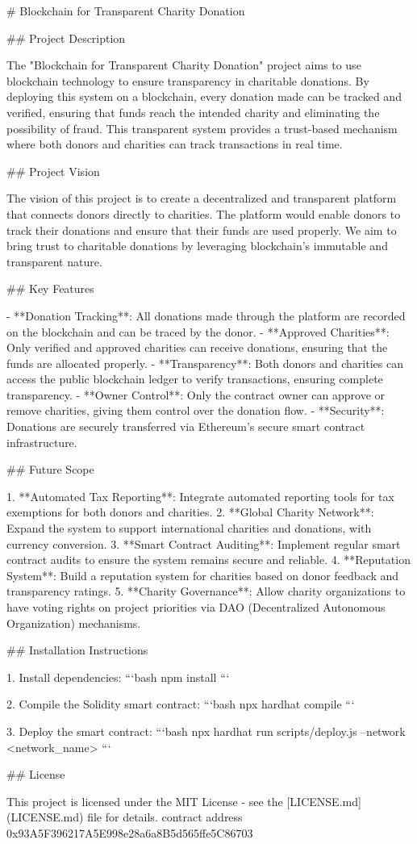 # Blockchain for Transparent Charity Donation

## Project Description

The "Blockchain for Transparent Charity Donation" project aims to use blockchain technology to ensure transparency in charitable donations. By deploying this system on a blockchain, every donation made can be tracked and verified, ensuring that funds reach the intended charity and eliminating the possibility of fraud. This transparent system provides a trust-based mechanism where both donors and charities can track transactions in real time.

## Project Vision

The vision of this project is to create a decentralized and transparent platform that connects donors directly to charities. The platform would enable donors to track their donations and ensure that their funds are used properly. We aim to bring trust to charitable donations by leveraging blockchain's immutable and transparent nature.

## Key Features

- **Donation Tracking**: All donations made through the platform are recorded on the blockchain and can be traced by the donor.
- **Approved Charities**: Only verified and approved charities can receive donations, ensuring that the funds are allocated properly.
- **Transparency**: Both donors and charities can access the public blockchain ledger to verify transactions, ensuring complete transparency.
- **Owner Control**: Only the contract owner can approve or remove charities, giving them control over the donation flow.
- **Security**: Donations are securely transferred via Ethereum’s secure smart contract infrastructure.

## Future Scope

1. **Automated Tax Reporting**: Integrate automated reporting tools for tax exemptions for both donors and charities.
2. **Global Charity Network**: Expand the system to support international charities and donations, with currency conversion.
3. **Smart Contract Auditing**: Implement regular smart contract audits to ensure the system remains secure and reliable.
4. **Reputation System**: Build a reputation system for charities based on donor feedback and transparency ratings.
5. **Charity Governance**: Allow charity organizations to have voting rights on project priorities via DAO (Decentralized Autonomous Organization) mechanisms.

## Installation Instructions

1. Install dependencies:
    ```bash
    npm install
    ```

2. Compile the Solidity smart contract:
    ```bash
    npx hardhat compile
    ```

3. Deploy the smart contract:
    ```bash
    npx hardhat run scripts/deploy.js --network <network_name>
    ```

## License

This project is licensed under the MIT License - see the [LICENSE.md](LICENSE.md) file for details.
contract address 0x93A5F396217A5E998e28a6a8B5d565ffe5C86703

